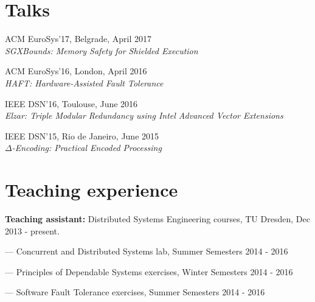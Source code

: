 \documentclass[letterpaper]{article}
\renewenvironment{itemize}{
  \begin{list}{}{
    \setlength{\leftmargin}{1.5em}
  }
}{
  \end{list}
}
\begin{document}







\section*{Talks}
\begin{itemize}
\item ACM EuroSys'17, Belgrade, April 2017\\
{\em  SGXBounds: Memory Safety for Shielded Execution}
\item ACM EuroSys'16, London, April 2016\\
	{\em  HAFT: Hardware-Assisted Fault Tolerance}
\item IEEE DSN'16, Toulouse, June 2016\\
	{\em  Elzar: Triple Modular Redundancy using Intel Advanced Vector Extensions}
\item IEEE DSN'15, Rio de Janeiro, June 2015\\
{\em  $\Delta$-Encoding: Practical Encoded Processing}
\end{itemize}


\section*{Teaching experience}

\begin{itemize}
\item {\bf Teaching assistant:} Distributed Systems Engineering courses, TU Dresden, Dec 2013 - present.
\begin{itemize}
	\item --- Concurrent and Distributed Systems lab, Summer Semesters 2014 - 2016 
	\item --- Principles of Dependable Systems exercises, Winter Semesters 2014 - 2016
	\item --- Software Fault Tolerance exercises, Summer Semesters 2014 - 2016
\end{itemize}
\end{itemize}
\end{document}
